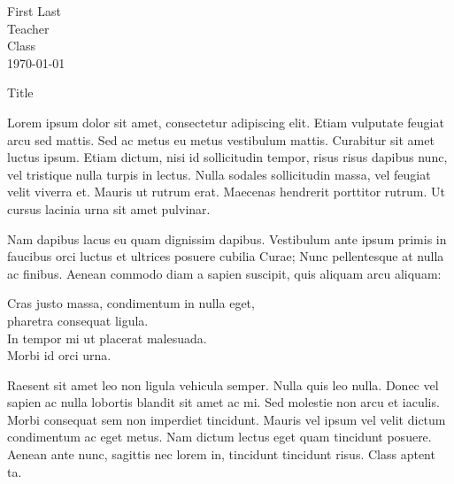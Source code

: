 \documentclass[12pt]{article}
\newcommand{\blockquotespacing}{\doublespaced}
\newcommand{\prose}{.25in}
\newcommand{\poetry}{0in}
\newcommand{\doublespaced}{}
\newenvironment{blockquote}[1][\prose]{\setlength{\parindent}{#1}\begin{quoting}\blockquotespacing}{\end{quoting}}
\begin{document}
\raggedright

	First Last \\ Teacher \\ Class \\ \today

	\centerline{Title}
    
\setlength{\parindent}{.5in}

Lorem ipsum dolor sit amet, consectetur adipiscing elit. Etiam vulputate feugiat arcu sed mattis. Sed ac metus eu metus vestibulum mattis. Curabitur sit amet luctus ipsum. Etiam dictum, nisi id sollicitudin tempor, risus risus dapibus nunc, vel tristique nulla turpis in lectus. Nulla sodales sollicitudin massa, vel feugiat velit viverra et. Mauris ut rutrum erat. Maecenas hendrerit porttitor rutrum. Ut cursus lacinia urna sit amet pulvinar. 

Nam dapibus lacus eu quam dignissim dapibus. Vestibulum ante ipsum primis in faucibus orci luctus et ultrices posuere cubilia Curae; Nunc pellentesque at nulla ac finibus. Aenean commodo diam a sapien suscipit, quis aliquam arcu aliquam:
\begin{blockquote}[\poetry]
Cras justo massa, condimentum in nulla eget, \\
pharetra consequat ligula. \\
In tempor mi ut placerat malesuada. \\
Morbi id orci urna.
\end{blockquote}
Raesent sit amet leo non ligula vehicula semper. Nulla quis leo nulla. Donec vel sapien ac nulla lobortis blandit sit amet ac mi. Sed molestie non arcu et iaculis. Morbi consequat sem non imperdiet tincidunt. Mauris vel ipsum vel velit dictum condimentum ac eget metus. Nam dictum lectus eget quam tincidunt posuere. Aenean ante nunc, sagittis nec lorem in, tincidunt tincidunt risus. Class aptent ta.

\end{document}

